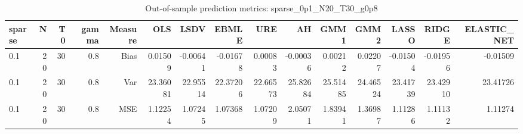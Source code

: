 \begin{table}[!htbp]\centering
\caption{Out-of-sample prediction metrics: sparse_0p1_N20_T30_g0p8}
\label{tab:table3_sparse_0p1_N20_T30_g0p8}
\begin{tabular}{lrrrrrrrrrrrrrr}
\hline
sparse & N & T0 & gamma & Measure & OLS & LSDV & EBMLE & URE & AH & GMM1 & GMM2 & LASSO & RIDGE & ELASTIC_NET \\
\hline
0.1 & 20 & 30 & 0.8 & Bias & 0.01509 & -0.00641 & -0.01678 & 0.00083 & -0.00036 & 0.00212 & 0.02207 & -0.01504 & -0.01956 & -0.01509 \\
0.1 & 20 & 30 & 0.8 & Var & 23.36081 & 22.95514 & 22.37206 & 22.66573 & 25.82684 & 25.51485 & 24.46524 & 23.41739 & 23.42910 & 23.41726 \\
0.1 & 20 & 30 & 0.8 & MSE & 1.12254 & 1.07245 & 1.07368 & 1.07209 & 2.05071 & 1.83941 & 1.36987 & 1.11286 & 1.11132 & 1.11274 \\
\hline
\end{tabular}
\end{table}

